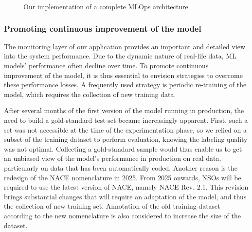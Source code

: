 \begin{figure}[htbp]
    \centering
    \caption{Our implementation of a complete MLOps architecture}
    \label{fig:full-architecture}
\end{figure}

\subsubsection{Promoting continuous improvement of the model}
\label{subsubsec:annotation}

The monitoring layer of our application provides an important and detailed view into the system performance. Due to the dynamic nature of real-life data, ML models' performance often decline over time. To promote continuous improvement of the model, it is thus essential to envision strategies to overcome these performance losses. A frequently used strategy is periodic re-training of the model, which requires the collection of new training data.

After several months of the first version of the model running in production, the need to build a gold-standard test set became increasingly apparent. First, such a set was not accessible at the time of the experimentation phase, so we relied on a subset of the training dataset to perform evaluation, knowing the labeling quality was not optimal. Collecting a gold-standard sample would thus enable us to get an unbiased view of the model's performance in production on real data, particularly on data that has been automatically coded. Another reason is the redesign of the NACE nomenclature in 2025. From 2025 onwards, NSOs will be required to use the latest version of NACE, namely NACE Rev. 2.1. This revision brings substantial changes that will require an adaptation of the model, and thus the collection of new training set. Annotation of the old training dataset according to the new nomenclature is also considered to increase the size of the dataset.

